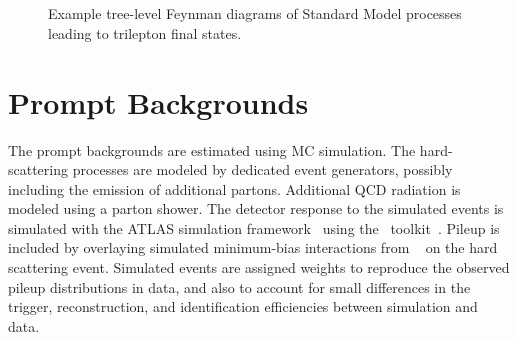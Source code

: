 \begin{figure}[p]
{	} \\
	 \\
	\caption{Example tree-level Feynman diagrams of Standard Model processes leading to trilepton final states.}
	\label{fig:multilepton-feynman-diagrams}
\end{figure}


\section{Prompt Backgrounds}\label{sec:prompt-backgrounds}
The prompt backgrounds are estimated using MC simulation. The hard-scattering processes are modeled by dedicated event generators, possibly including the emission of additional partons. Additional QCD radiation is modeled using a parton shower. The detector response to the simulated events is simulated with the ATLAS simulation framework~\cite{TheATLASCollaboration:2010et} using the \geant\ toolkit~\cite{Agostinelli:2002hh}. Pileup is included by overlaying simulated minimum-bias interactions from \pythia~\cite{pythia6} on the hard scattering event. Simulated events are assigned weights to reproduce the observed pileup distributions in data, and also to account for small differences in the trigger, reconstruction, and identification efficiencies between simulation and data. 

